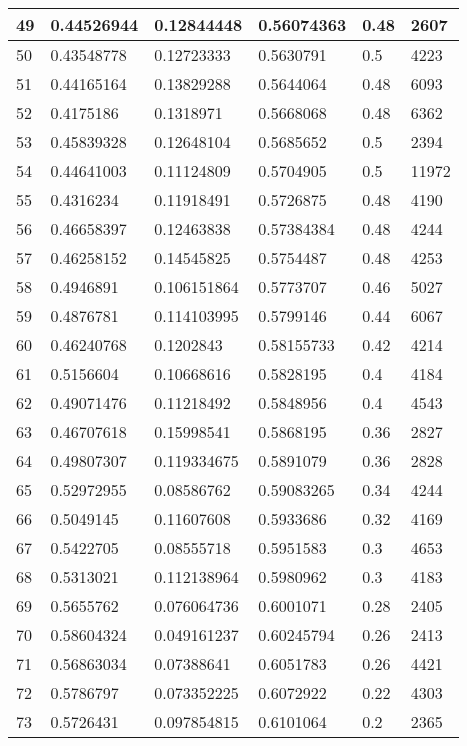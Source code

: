 \begin{longtable}{|l|l|l|l|l|l|}
49 & 0.44526944 & 0.12844448 & 0.56074363 & 0.48 & 2607 \\ \hline 
50 & 0.43548778 & 0.12723333 & 0.5630791 & 0.5 & 4223 \\ \hline 
51 & 0.44165164 & 0.13829288 & 0.5644064 & 0.48 & 6093 \\ \hline 
52 & 0.4175186 & 0.1318971 & 0.5668068 & 0.48 & 6362 \\ \hline 
53 & 0.45839328 & 0.12648104 & 0.5685652 & 0.5 & 2394 \\ \hline 
54 & 0.44641003 & 0.11124809 & 0.5704905 & 0.5 & 11972 \\ \hline 
55 & 0.4316234 & 0.11918491 & 0.5726875 & 0.48 & 4190 \\ \hline 
56 & 0.46658397 & 0.12463838 & 0.57384384 & 0.48 & 4244 \\ \hline 
57 & 0.46258152 & 0.14545825 & 0.5754487 & 0.48 & 4253 \\ \hline 
58 & 0.4946891 & 0.106151864 & 0.5773707 & 0.46 & 5027 \\ \hline 
59 & 0.4876781 & 0.114103995 & 0.5799146 & 0.44 & 6067 \\ \hline 
60 & 0.46240768 & 0.1202843 & 0.58155733 & 0.42 & 4214 \\ \hline 
61 & 0.5156604 & 0.10668616 & 0.5828195 & 0.4 & 4184 \\ \hline 
62 & 0.49071476 & 0.11218492 & 0.5848956 & 0.4 & 4543 \\ \hline 
63 & 0.46707618 & 0.15998541 & 0.5868195 & 0.36 & 2827 \\ \hline 
64 & 0.49807307 & 0.119334675 & 0.5891079 & 0.36 & 2828 \\ \hline 
65 & 0.52972955 & 0.08586762 & 0.59083265 & 0.34 & 4244 \\ \hline 
66 & 0.5049145 & 0.11607608 & 0.5933686 & 0.32 & 4169 \\ \hline 
67 & 0.5422705 & 0.08555718 & 0.5951583 & 0.3 & 4653 \\ \hline 
68 & 0.5313021 & 0.112138964 & 0.5980962 & 0.3 & 4183 \\ \hline 
69 & 0.5655762 & 0.076064736 & 0.6001071 & 0.28 & 2405 \\ \hline 
70 & 0.58604324 & 0.049161237 & 0.60245794 & 0.26 & 2413 \\ \hline 
71 & 0.56863034 & 0.07388641 & 0.6051783 & 0.26 & 4421 \\ \hline 
72 & 0.5786797 & 0.073352225 & 0.6072922 & 0.22 & 4303 \\ \hline 
73 & 0.5726431 & 0.097854815 & 0.6101064 & 0.2 & 2365 \\ \hline 

\end{longtable}

